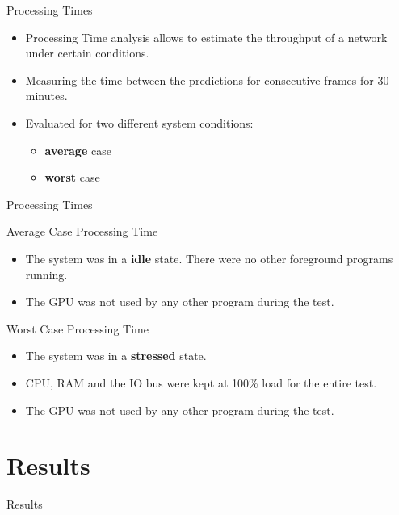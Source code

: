 \documentclass[18pt]{beamer}
\begin{document}
\begin{frame}{Processing Times}
	\begin{itemize}
		\item Processing Time analysis allows to estimate the throughput of a network under certain conditions.
		\item Measuring the time between the predictions for consecutive frames for 30 minutes.
		\item Evaluated for two different system conditions:
        \begin{itemize}
            \item \textbf{average} case
            \item \textbf{worst} case 
        \end{itemize}
	\end{itemize}
\end{frame}

\begin{frame}{Processing Times}
\begin{block}{Average Case Processing Time}
	\begin{itemize}
		\item The system was in a \textbf{idle} state. There were no other foreground programs running.
		\item The GPU was not used by any other program during the test.
	\end{itemize}
\end{block}
\pause
\begin{block}{Worst Case Processing Time}
	\begin{itemize}
		\item The system was in a \textbf{stressed} state.
		\item CPU, RAM and the IO bus were kept at 100\% load for the entire test.
		\item The GPU was not used by any other program during the test.
	\end{itemize}
\end{block}
\end{frame}

\section{Results}

\begin{frame}
\vfill
\centering
{\LARGE Results}
\vfill
\end{frame}
\end{document}
